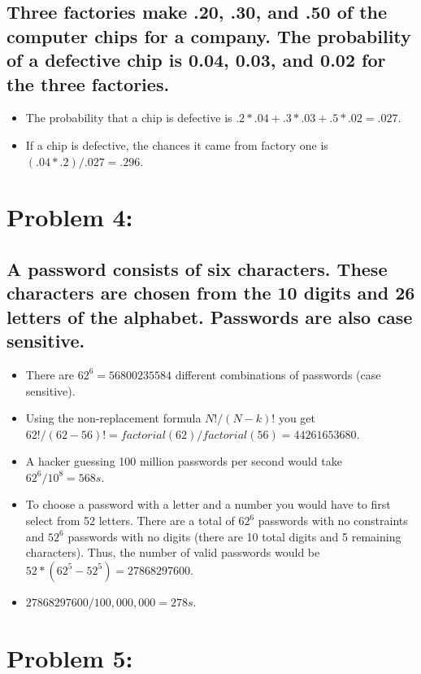 \documentclass{article} %
\begin{document}
\subsection{Three factories make .20, .30, and .50 of the computer chips for a company. The
probability of a defective chip is 0.04, 0.03, and 0.02 for the three factories.}

\begin{itemize}
    \item The probability that a chip is defective is \(.2*.04 + .3*.03 + .5*.02 = .027\).
    \item If a chip is defective, the chances it came from factory one is \((.04*.2)/.027 = .296\).
\end{itemize}

\section{Problem 4:}
\subsection{A password consists of six characters. These characters are chosen from the 10 digits
and 26 letters of the alphabet. Passwords are also case sensitive.}
\begin{itemize}
    \item There are \(62^6 = 56800235584\) different combinations of passwords (case sensitive).
    \item Using the non-replacement formula \(N!/(N-k)!\) you get \(62!/(62-56)! = factorial(62) / factorial(56) = 44261653680\).
    \item A hacker guessing 100 million passwords per second would take \(62^6/10^8 = 568s\).
    \item To choose a password with a letter and a number you would have to first select from 52 letters. There are a total of 
    \(62^6\) passwords with no constraints and \(52^6\) passwords with no digits (there are 10 total digits and 5 remaining 
    characters). Thus, the
    number of valid passwords would be \(52*(62^5-52^5) =27868297600\).
    \item \(27868297600/100,000,000 = 278s\).

\end{itemize}

\section{Problem 5:}
\end{document}
